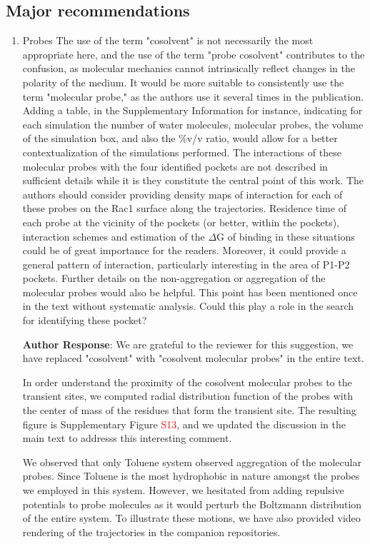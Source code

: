 \documentclass[11pt, a4paper]{article}
\begin{document}
\subsection{Major recommendations}
\begin{enumerate}
    \item Probes
    The use of the term "cosolvent" is not necessarily the most appropriate here, and the use of the term "probe cosolvent" contributes to the confusion, as molecular mechanics cannot intrinsically reflect changes in the polarity of the medium. It would be more suitable to consistently use the term "molecular probe," as the authors use it several times in the publication. Adding a table, in the Supplementary Information for instance, indicating for each simulation the number of water molecules, molecular probes, the volume of the simulation box, and also the \%v/v ratio, would allow for a better contextualization of the simulations performed.
    The interactions of these molecular probes with the four identified pockets are not described in sufficient details while it is they constitute the central point of this work. The authors should consider providing density maps of interaction for each of these probes on the Rac1 surface along the trajectories. Residence time of each probe at the vicinity of the pockets (or better, within the pockets), interaction schemes and estimation of the $\Delta$G of binding in these situations could be of great importance for the readers. Moreover, it could provide a general pattern of interaction, particularly interesting in the area of P1-P2 pockets.
    Further details on the non-aggregation or aggregation of the molecular probes would also be helpful. This point has been mentioned once in the text without systematic analysis. Could this play a role in the search for identifying these pocket?

    \textbf{Author Response}: We are grateful to the reviewer for this suggestion, we have replaced "cosolvent" with "cosolvent molecular probes" in the entire text. 

    In order understand the proximity of the cosolvent molecular probes to the transient sites, we computed radial distribution function of the probes with the center of mass of the residues that form the transient site. The resulting figure is Supplementary Figure \textcolor{red}{S13}, and we updated the discussion in the main text to addresss this interesting comment. 

    We observed that only Toluene system observed aggregation of the molecular probes. Since Toluene is the most hydrophobic in nature amongst the probes we employed in this system. However, we hesitated from adding repulsive potentials to probe molecules as it would perturb the Boltzmann distribution of the entire system. To illustrate these motions, we have also provided video rendering of the trajectories in the companion repositories.


\end{enumerate}
\end{document}
